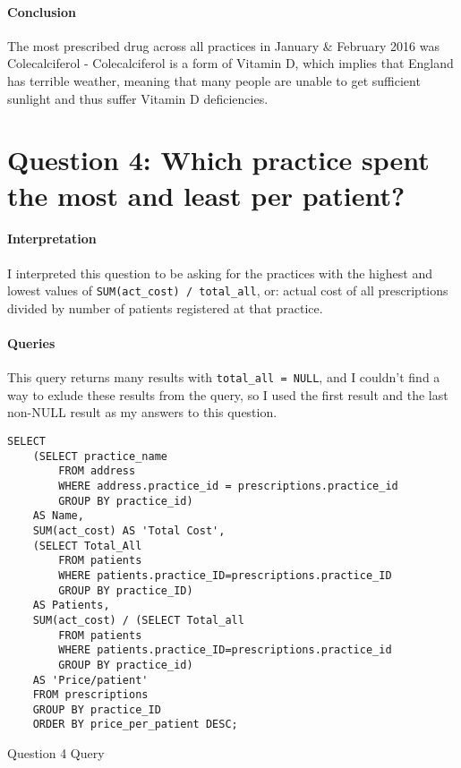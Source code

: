 \documentclass{report}
\begin{document}
\paragraph{Conclusion}
The most prescribed drug across all practices in January \& February 2016 was Colecalciferol - Colecalciferol is a form of Vitamin D, which implies that England has terrible weather, meaning that many people are unable to get sufficient sunlight and thus suffer Vitamin D deficiencies.

\section{Question 4: Which practice spent the most and least per patient?}
\paragraph{Interpretation}
I interpreted this question to be asking for the practices with the highest and lowest values of \texttt{SUM(act\_cost) / total\_all}, or: actual cost of all prescriptions divided by number of patients registered at that practice.
\paragraph{Queries}
This query returns many results with \texttt{total\_all = NULL}, and I couldn't find a way to exlude these results from the query, so I used the first result and the last non-NULL result as my answers to this question.

\begin{listing}[H]
\begin{verbatim}
SELECT
    (SELECT practice_name 
        FROM address 
        WHERE address.practice_id = prescriptions.practice_id 
        GROUP BY practice_id) 
    AS Name,
    SUM(act_cost) AS 'Total Cost',
    (SELECT Total_All 
        FROM patients 
        WHERE patients.practice_ID=prescriptions.practice_ID 
        GROUP BY practice_ID) 
    AS Patients,
    SUM(act_cost) / (SELECT Total_all 
        FROM patients 
        WHERE patients.practice_ID=prescriptions.practice_id 
        GROUP BY practice_id) 
    AS 'Price/patient' 
    FROM prescriptions 
    GROUP BY practice_ID 
    ORDER BY price_per_patient DESC;
\end{verbatim}
\caption{Question 4 Query}
\label{lst: Q4-1}
\end{listing}
\end{document}
